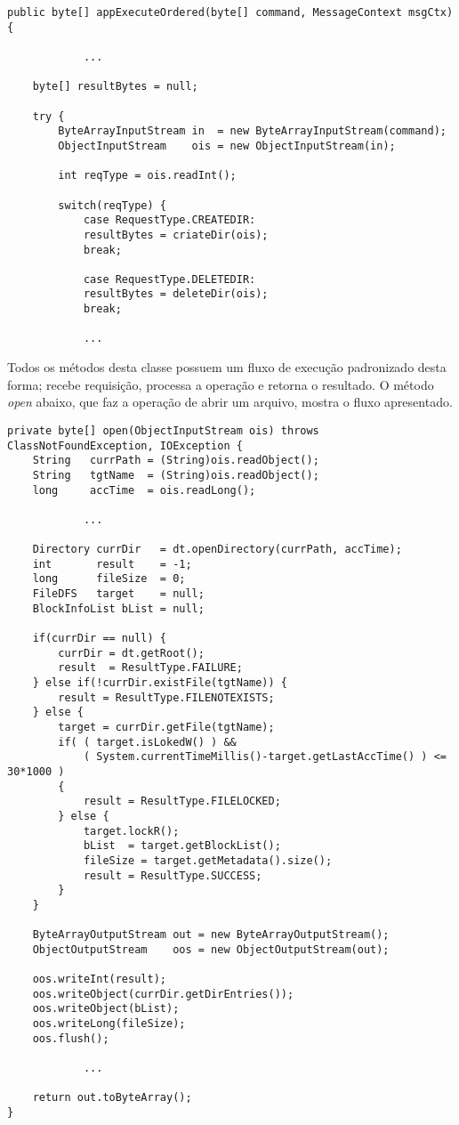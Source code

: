 \begin{lstlisting}[basicstyle=\ttfamily\footnotesize, frame=single]		
public byte[] appExecuteOrdered(byte[] command, MessageContext msgCtx) {
			
			...
			
	byte[] resultBytes = null;
	
	try {
		ByteArrayInputStream in  = new ByteArrayInputStream(command);
		ObjectInputStream    ois = new ObjectInputStream(in);
		
		int reqType = ois.readInt();
		
		switch(reqType) {
			case RequestType.CREATEDIR:
			resultBytes = criateDir(ois);
			break;
			
			case RequestType.DELETEDIR:
			resultBytes = deleteDir(ois);
			break;

			...
\end{lstlisting}	

Todos os métodos desta classe possuem um fluxo de execução padronizado desta forma; recebe requisição, processa a operação e retorna o resultado. 
O método \textit{open} abaixo, que faz a operação de abrir um arquivo, mostra o fluxo apresentado.

\begin{lstlisting}[basicstyle=\ttfamily\footnotesize, frame=single]		
private byte[] open(ObjectInputStream ois) throws ClassNotFoundException, IOException {
	String   currPath = (String)ois.readObject();
	String   tgtName  = (String)ois.readObject();
	long     accTime  = ois.readLong();
	
			...
	
	Directory currDir   = dt.openDirectory(currPath, accTime);
	int       result    = -1;
	long      fileSize  = 0;
	FileDFS   target    = null;
	BlockInfoList bList = null;
	
	if(currDir == null) {
		currDir = dt.getRoot();
		result  = ResultType.FAILURE;
	} else if(!currDir.existFile(tgtName)) {
		result = ResultType.FILENOTEXISTS;
	} else {
		target = currDir.getFile(tgtName);
		if( ( target.isLokedW() ) &&
			( System.currentTimeMillis()-target.getLastAccTime() ) <= 30*1000 ) 
		{
			result = ResultType.FILELOCKED;
		} else {
			target.lockR();
			bList  = target.getBlockList();
			fileSize = target.getMetadata().size();
			result = ResultType.SUCCESS;
		}
	}

	ByteArrayOutputStream out = new ByteArrayOutputStream();
	ObjectOutputStream    oos = new ObjectOutputStream(out);

	oos.writeInt(result);
	oos.writeObject(currDir.getDirEntries());
	oos.writeObject(bList);
	oos.writeLong(fileSize);
	oos.flush();
	
			...
				
	return out.toByteArray();
}
\end{lstlisting}


